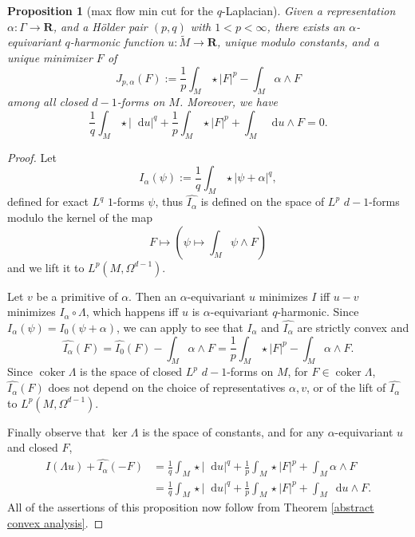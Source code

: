 \documentclass[reqno,11pt]{amsart}
\newcommand{\RR}{\mathbf{R}}
\newcommand*\dif{\mathop{}\!\mathrm{d}}
\DeclareMathOperator{\coker}{coker}
\newtheorem{proposition}[theorem]{Proposition}
\theoremstyle{definition}
\numberwithin{equation}{section}
\begin{document}
\begin{proposition}[max flow min cut for the $q$-Laplacian]\label{mfmc qLaplacian}
Given a representation $\alpha: \Gamma \to \RR$, and a H\"older pair $(p, q)$ with $1 < p < \infty$, there exists an $\alpha$-equivariant $q$-harmonic function $u: \tilde M \to \RR$, unique modulo constants, and a unique minimizer $F$ of 
$$J_{p, \alpha}(F) := \frac{1}{p} \int_M \star |F|^p - \int_M \alpha \wedge F$$
among all closed $d - 1$-forms on $M$.
Moreover, we have
\begin{equation}\label{strong duality}
	\frac{1}{q} \int_M \star |\dif u|^q + \frac{1}{p} \int_M \star |F|^p + \int_M \dif u \wedge F = 0.
\end{equation}
\end{proposition}
\begin{proof}
Let
$$I_\alpha(\psi) := \frac{1}{q} \int_M \star |\psi + \alpha|^q,$$
defined for exact $L^q$ $1$-forms $\psi$, thus $\widehat{I_\alpha}$ is defined on the space of $L^p$ $d - 1$-forms modulo the kernel of the map
$$F \mapsto \left(\psi \mapsto \int_M \psi \wedge F\right)$$
and we lift it to $L^p(M, \Omega^{d - 1})$.

Let $v$ be a primitive of $\alpha$.
Then an $\alpha$-equivariant $u$ minimizes $I$ iff $u - v$ minimizes $I_\alpha \circ \Lambda$, which happens iff $u$ is $\alpha$-equivariant $q$-harmonic.
Since $I_\alpha(\psi) = I_0(\psi + \alpha)$, we can apply \cite[Chapter I, Remark 4.1]{Ekeland99} to see that $I_\alpha$ and $\widehat{I_\alpha}$ are strictly convex and
$$\widehat{I_\alpha}(F) = \widehat{I_0}(F) - \int_M \alpha \wedge F = \frac{1}{p} \int_M \star |F|^p - \int_M \alpha \wedge F.$$
Since $\coker \Lambda$ is the space of closed $L^p$ $d - 1$-forms on $M$, for $F \in \coker \Lambda$, $\widehat{I_\alpha}(F)$ does not depend on the choice of representatives $\alpha, v$, or of the lift of $\widehat{I_\alpha}$ to $L^p(M, \Omega^{d - 1})$.

Finally observe that $\ker \Lambda$ is the space of constants, and for any $\alpha$-equivariant $u$ and closed $F$,
\begin{align*}
I(\Lambda u) + \widehat{I_\alpha}(-F)
&= \frac{1}{q} \int_M \star |\dif u|^q + \frac{1}{p} \int_M \star |F|^p + \int_M \alpha \wedge F \\
&= \frac{1}{q} \int_M \star |\dif u|^q + \frac{1}{p} \int_M \star |F|^p + \int_M \dif u \wedge F.
\end{align*}
All of the assertions of this proposition now follow from Theorem \ref{abstract convex analysis}.
\end{proof}
\end{document}
